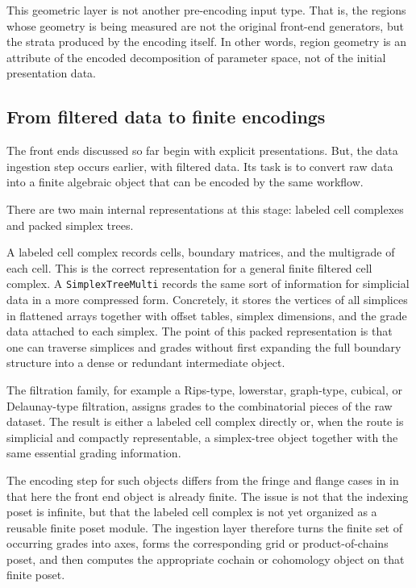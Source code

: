 \documentclass[11pt]{article}
\theoremstyle{definition}
\theoremstyle{remark}
\begin{document}
This geometric layer is not another pre-encoding input type.  That is, the regions whose geometry is being measured are not the original front-end generators, but the strata produced by the encoding itself.  In other words, region geometry is an attribute of the encoded decomposition of parameter space, not of the initial presentation data.

\subsection{From filtered data to finite encodings}
\label{subsec:data-to-encoding}

The front ends discussed so far begin with explicit presentations. But, the data ingestion step occurs earlier, with filtered data.  Its task is to convert raw data into a finite algebraic object that can be encoded by the same workflow.

There are two main internal representations at this stage: labeled cell complexes and packed simplex trees.

A labeled cell complex records cells, boundary matrices, and the multigrade of each cell.  This is the correct representation for a general finite filtered cell complex.  A \texttt{SimplexTreeMulti} records the same sort of information for simplicial data in a more compressed form.  Concretely, it stores the vertices of all simplices in flattened arrays together with offset tables, simplex dimensions, and the grade data attached to each simplex.  The point of this packed representation is that one can traverse simplices and grades without first expanding the full boundary structure into a dense or redundant intermediate object.

The filtration family, for example a Rips-type, lowerstar, graph-type, cubical, or Delaunay-type filtration, assigns grades to the combinatorial pieces of the raw dataset.  The result is either a labeled cell complex directly or, when the route is simplicial and compactly representable, a simplex-tree object together with the same essential grading information.

The encoding step for such objects differs from the fringe and flange cases in in that here the front end object is already finite.  The issue is not that the indexing poset is infinite, but that the labeled cell complex is not yet organized as a reusable finite poset module.  The ingestion layer therefore turns the finite set of occurring grades into axes, forms the corresponding grid or product-of-chains poset, and then computes the appropriate cochain or cohomology object on that finite poset.
\end{document}
